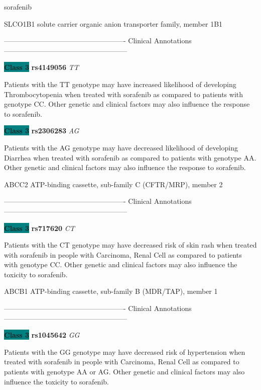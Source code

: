 \documentclass{resume} %
\begin{document}
\begin{rSection}{ sorafenib }
\begin{rSubsection}{ SLCO1B1 }{ solute carrier organic anion transporter family, member 1B1 }{}{}
\item[] ---------------------------------------------------- Clinical Annotations -----------------------------------------------------\newline
\item \textbf{\colorbox{teal} {Class 3}} \textbf{ rs4149056 } \textit{ TT }
\item[] Patients with the TT genotype may have increased likelihood of developing Thrombocytopenia when treated with sorafenib as compared to patients with genotype CC. Other genetic and clinical factors may also influence the response to sorafenib.\item \textbf{\colorbox{teal} {Class 3}} \textbf{ rs2306283 } \textit{ AG }
\item[] Patients with the AG genotype may have decreased likelihood of developing Diarrhea when treated with sorafenib as compared to patients with genotype AA. Other genetic and clinical factors may also influence the response to sorafenib.
\end{rSubsection}\begin{rSubsection}{ ABCC2 }{ ATP-binding cassette, sub-family C (CFTR/MRP), member 2 }{}{}
\item[]

\item[] ---------------------------------------------------- Clinical Annotations -----------------------------------------------------\newline
\item \textbf{\colorbox{teal} {Class 3}} \textbf{ rs717620 } \textit{ CT }
\item[] Patients with the CT genotype may have decreased risk of skin rash when treated with sorafenib in people with Carcinoma, Renal Cell as compared to patients with genotype CC. Other genetic and clinical factors may also influence the toxicity to sorafenib.
\end{rSubsection}\begin{rSubsection}{ ABCB1 }{ ATP-binding cassette, sub-family B (MDR/TAP), member 1 }{}{}
\item[]

\item[] ---------------------------------------------------- Clinical Annotations -----------------------------------------------------\newline
\item \textbf{\colorbox{teal} {Class 3}} \textbf{ rs1045642 } \textit{ GG }
\item[] Patients with the GG genotype may have decreased risk of hypertension when treated with sorafenib in people with Carcinoma, Renal Cell as compared to patients with genotype AA or AG. Other genetic and clinical factors may also influence the toxicity to sorafenib.
\end{rSubsection}


\end{rSection}
\end{document}
